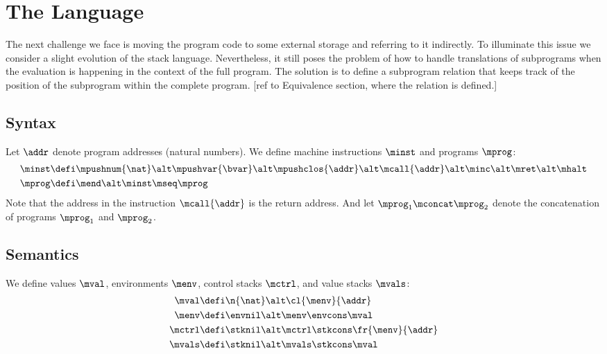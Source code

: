 \section*{The \textnormal{\mlang} Language}

The next challenge we face is moving the program code to some external storage and referring to it indirectly.
To illuminate this issue we consider a slight evolution of the stack language.
Nevertheless, it still poses the problem of how to handle translations of subprograms when the evaluation is happening in the context of the full program.
The solution is to define a subprogram relation that keeps track of the position of the subprogram within the complete program.
[ref to Equivalence section, where the relation is defined.]

\subsection*{Syntax}

Let $\addr$ denote program addresses (natural numbers).
We define machine instructions $\minst$ and programs $\mprog$:
\begin{align*}
  \minst &\defi \mpushnum{\nat} \alt \mpushvar{\bvar} \alt \mpushclos{\addr} \alt \mcall{\addr} \alt \minc \alt \mret \alt \mhalt \\
  \mprog &\defi \mend \alt \minst \mseq \mprog
\end{align*}
Note that the address in the instruction $\mcall{\addr}$ is the return address.
And let $\mprog_1 \mconcat \mprog_2$ denote the concatenation of programs $\mprog_1$ and $\mprog_2$.



\subsection*{Semantics}

We define values $\mval$, environments $\menv$, control stacks $\mctrl$, and value stacks $\mvals$:
\begin{align*}
  \mval &\defi \n{\nat} \alt \cl{\menv}{\addr} \\
  \menv &\defi \envnil \alt \menv \envcons \mval \\
  \mctrl &\defi \stknil \alt \mctrl \stkcons \fr{\menv}{\addr} \\
  \mvals &\defi \stknil \alt \mvals \stkcons \mval
\end{align*}


